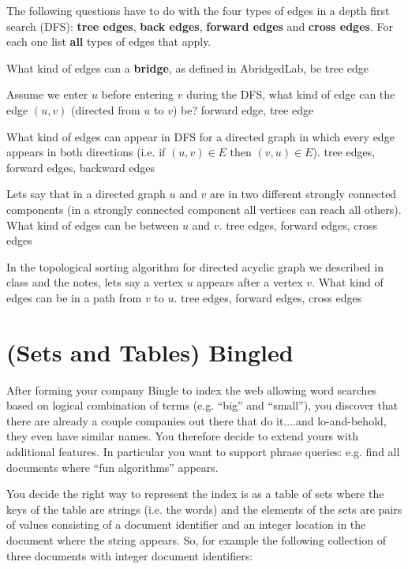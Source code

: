 \begin{problem}
%

The following questions have to do with the four types of edges in
a depth first search (DFS): \textbf{tree edges}, \textbf{back edges},
\textbf{forward edges} and \textbf{cross edges}.  For each one list
\textbf{all} types of edges that apply.


\ask[3.]
What kind of edges can a \textbf{bridge}, as defined in AbridgedLab, be
\sol
tree edge

\ask[3.]
Assume we enter $u$ before entering $v$ during the DFS, what kind of
edge can the edge $(u,v)$ (directed from $u$ to $v$) be?
\sol
forward edge, tree edge


\ask[3.]
What kind of edges can appear in DFS for a directed graph in which
every edge appears in both directions (i.e. if $(u,v) \in E$ then $(v,u)
\in E$).
\sol
tree edges, forward edges, backward edges


\ask[3.] Lets say that in a directed graph $u$ and $v$ are in two
different strongly connected components (in a strongly connected
component all vertices can reach all others).  What kind of edges can
be between $u$ and $v$.
\sol
tree edges, forward edges, cross edges

\ask[3.]
In the topological sorting algorithm for directed acyclic graph we
described in class and the notes, lets say a vertex $u$ appears
after a vertex $v$.  What kind of edges can be in a path
from $v$ to $u$.
\sol
tree edges, forward edges, cross edges

\end{problem}



\section{(Sets and Tables) Bingled}


%

After forming your company Bingle to index the web allowing word
searches based on logical combination of terms (e.g. ``big'' and
``small''), you discover that there are already a couple companies out
there that do it....and lo-and-behold, they even have similar names.
You therefore decide to extend yours with additional features.  In
particular you want to support phrase queries: e.g. find all
documents where ``fun algorithms'' appears.

You decide the right way to represent the index is as a table of sets
where the keys of the table are strings (i.e. the words) and the
elements of the sets are pairs of values consisting of a document
identifier and an integer location in the document where the string
appears.  So, for example the following collection of three documents
with integer document identifiers:

